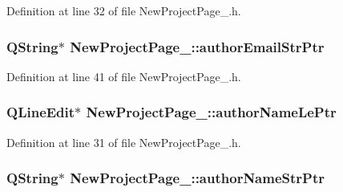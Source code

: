 Definition at line 32 of file New\-Project\-Page\-\_.\-h.

\hypertarget{class_new_project_page__3_a5c83d9f13f428782e082537dd4c65187}{
\subsubsection[{author\-Email\-Str\-Ptr}]{\setlength{\rightskip}{0pt plus 5cm}Q\-String$\ast$ New\-Project\-Page\-\_\-::author\-Email\-Str\-Ptr\hspace{0.3cm}{\ttfamily [private]}}}\label{class_new_project_page__3_a5c83d9f13f428782e082537dd4c65187}


Definition at line 41 of file New\-Project\-Page\-\_.\-h.

\hypertarget{class_new_project_page__3_aea99558cfb4c4d06ab1d090276c8b500}{
\subsubsection[{author\-Name\-Le\-Ptr}]{\setlength{\rightskip}{0pt plus 5cm}Q\-Line\-Edit$\ast$ New\-Project\-Page\-\_\-::author\-Name\-Le\-Ptr\hspace{0.3cm}{\ttfamily [private]}}}\label{class_new_project_page__3_aea99558cfb4c4d06ab1d090276c8b500}


Definition at line 31 of file New\-Project\-Page\-\_.\-h.

\hypertarget{class_new_project_page__3_a40c6cfc7ba480fd2572459c9ff2d08bb}{
\subsubsection[{author\-Name\-Str\-Ptr}]{\setlength{\rightskip}{0pt plus 5cm}Q\-String$\ast$ New\-Project\-Page\-\_\-::author\-Name\-Str\-Ptr\hspace{0.3cm}{\ttfamily [private]}}}\label{class_new_project_page__3_a40c6cfc7ba480fd2572459c9ff2d08bb}


